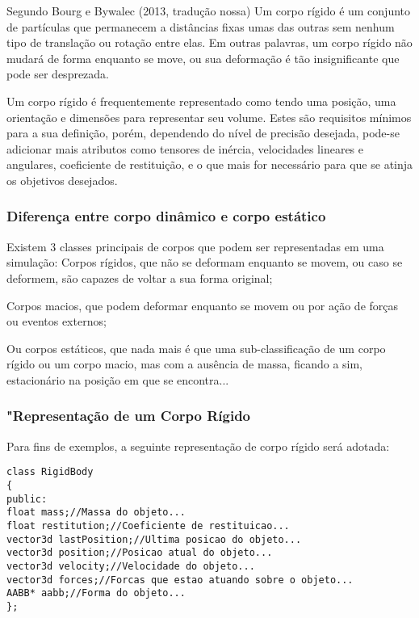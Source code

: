 Segundo Bourg e Bywalec (2013, tradução nossa) Um corpo rígido é um conjunto de partículas  que permanecem a distâncias fixas umas das outras  sem nenhum tipo de translação ou rotação entre elas. Em outras palavras,  um corpo rígido não mudará de forma enquanto se move, ou sua deformação é tão insignificante que pode ser desprezada.

Um corpo rígido é  frequentemente representado como tendo uma posição, uma orientação  e  dimensões para representar seu volume. Estes são requisitos mínimos para a  sua definição, porém, dependendo do nível de precisão desejada, pode-se adicionar mais atributos como tensores de inércia, velocidades lineares e angulares, coeficiente de restituição, e o que mais for necessário para que se atinja os objetivos desejados.

\subsubsection{ Diferença entre corpo dinâmico e corpo estático}

Existem 3 classes principais de corpos que podem ser representadas em uma simulação:
Corpos rígidos, que não se deformam  enquanto se movem, ou caso se deformem, são capazes de voltar a sua forma original;


Corpos macios, que podem deformar enquanto se movem ou por ação de forças ou eventos externos;

Ou corpos estáticos, que nada mais é que uma sub-classificação de um corpo rígido ou um corpo macio,  mas com a ausência de massa, ficando a sim, estacionário na posição em que se
encontra...

\subsubsection{"Representação de um Corpo Rígido}

Para fins de exemplos, a seguinte representação de corpo rígido será adotada:

\begin{lstlisting}[frame=single,caption=Exemplo de corpo rígido\label{code:RigidBody}]
class RigidBody
{
public:
float mass;//Massa do objeto...
float restitution;//Coeficiente de restituicao...
vector3d lastPosition;//Ultima posicao do objeto...
vector3d position;//Posicao atual do objeto...
vector3d velocity;//Velocidade do objeto...
vector3d forces;//Forcas que estao atuando sobre o objeto...
AABB* aabb;//Forma do objeto...
};
\end{lstlisting}


